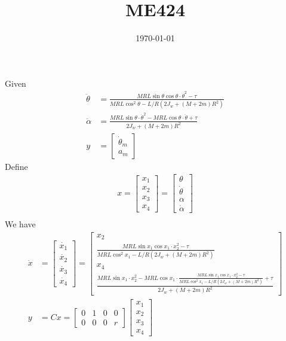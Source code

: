 \documentclass{article}
\title{ME424}
\date{\today}
\begin{document}
\maketitle

\section{}
Given
\begin{align*}
    \ddot{\theta} & =\frac{MRL\sin\theta\cos\theta\cdot\dot{\theta}^2-\tau}
    {MRL\cos^2\theta-L/R(2J_w+(M+2m)R^2)}
    \\
    \ddot{\alpha} & =\frac{MRL\sin\theta\cdot\dot{\theta}^2-MRL\cos\theta\cdot\ddot{\theta}+\tau}
    {2J_w+(M+2m)R^2}
    \\
    y             & =
    \begin{bmatrix}
        \dot{\theta}_m \\a_m
    \end{bmatrix}
\end{align*}
Define
\begin{align*}
    x=
    \begin{bmatrix}
        x_1 \\x_2\\x_3\\x_4
    \end{bmatrix}
    =
    \begin{bmatrix}
        \theta \\\dot{\theta}\\\alpha\\\dot{\alpha}
    \end{bmatrix} \\
\end{align*}
We have
\begin{align*}
    \dot{x} & =
    \begin{bmatrix}
        \dot{x_1} \\\dot{x_2}\\\dot{x_3}\\\dot{x_4}
    \end{bmatrix}
    =
    \begin{bmatrix}
        x_2 \\
        \frac{MRL\sin x_1\cos x_1\cdot x_2^2-\tau}
        {MRL\cos^2 x_1-L/R(2J_w+(M+2m)R^2)}
        \\
        x_4 \\
        \frac{MRL\sin x_1\cdot x_2^2-MRL\cos x_1\cdot
            \frac{MRL\sin x_1\cos x_1\cdot x_2^2-\tau}
            {MRL\cos^2 x_1-L/R(2J_w+(M+2m)R^2)}+\tau}
        {2J_w+(M+2m)R^2}
    \end{bmatrix} \\
    y       & =Cx=
    \begin{bmatrix}
        0 & 1 & 0 & 0 \\0&0&0&r
    \end{bmatrix}
    \begin{bmatrix}
        x_1 \\x_2\\x_3\\x_4
    \end{bmatrix}
\end{align*}
\end{document}
